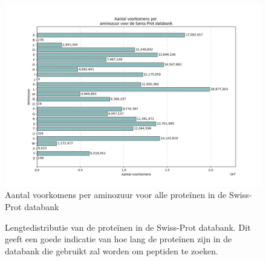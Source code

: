 \documentclass[11pt,dutch,faculty=we,layout=titlefont,underline=false,titleUppercase=true,titleUnderline=true]{ugent2016-report}
\begin{document}
    \begin{figure}[H]
        \centering
        \includegraphics[width=0.7\linewidth]{swissprot_aminozuur_voorkomens}
        \caption{Aantal voorkomens per aminozuur voor alle proteïnen in de Swiss-Prot databank}
        \label{fig:swissprot_aminozuur}
    \end{figure}

    \begin{figure}[H]
        \centering
        \hfill
        \caption{Lengtedistributie van de proteïnen in de Swiss-Prot databank. Dit geeft een goede indicatie van hoe lang de proteïnen zijn in de databank die gebruikt zal worden om peptiden te zoeken.}\label{fig:swissprot_length}
    \end{figure}
\end{document}
